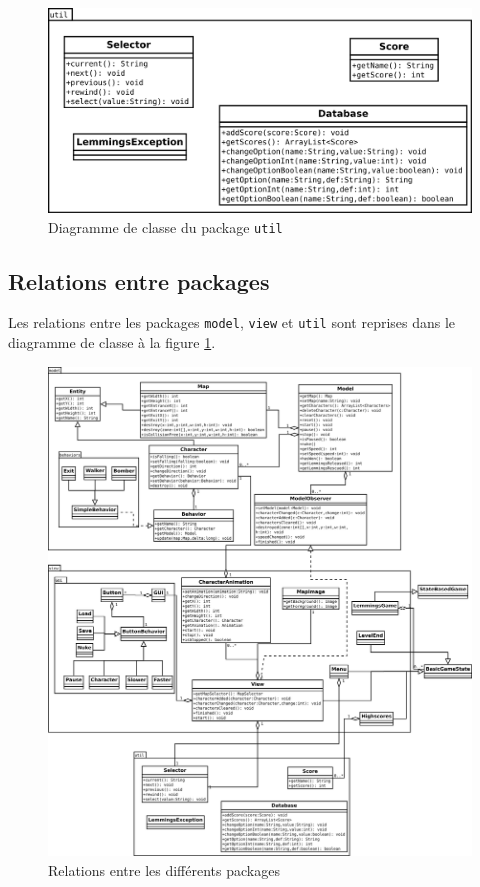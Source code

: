 \documentclass[a4paper,12pt]{article}
\begin{document}
\begin{figure}[ht!]
  \centerline{
  \includegraphics[width=\textwidth]{util.png}}
  \caption{Diagramme de classe du package \texttt{util}}
\end{figure}

\subsection{Relations entre packages}
Les relations entre les packages \texttt{model}, \texttt{view} et
\texttt{util} sont reprises dans le diagramme de classe à la figure
\ref{fig:Relations}.

\begin{figure}[ht!]
  \centerline{
  \includegraphics[width=1.2\textwidth]{relations.png}}
  \caption{Relations entre les différents packages}
  \label{fig:Relations}
\end{figure}
\end{document}
